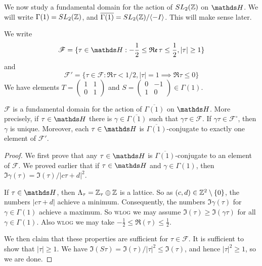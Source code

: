 \documentclass[10pt,a4paper]{article}
\begin{document}
We now study a fundamental domain for the action of $SL_2(\mathbb{Z})$ on $\H$. We will write $\Gamma(1) = SL_2(\mathbb{Z})$, and $\overline{\Gamma(1)} = SL_2(\mathbb{Z})/\langle -I \rangle$. This will make sense later.

We write \[\mathscr{F} = \{\tau \in \H : -\frac12 \leq \Re\tau \leq \frac12, |\tau|\geq 1\}\] and \[\mathscr{F}' = \{\tau \in \mathscr{F} : \Re \tau < 1/2, |\tau| = 1 \implies \Re\tau \leq 0\}\]
We have elements $T = \begin{pmatrix} 1&1\\0&1\end{pmatrix}$ and $S =\begin{pmatrix}0&-1\\1&0\end{pmatrix}\in \Gamma(1)$.
\begin{proposition}
  $\mathscr{F}$ is a fundamental domain for the action of $\overline{\Gamma(1)}$ on $\H$. More precisely, if $\tau\in\H$ there is $\gamma \in \overline{\Gamma(1)}$ such that $\gamma\tau \in \mathscr{F}$. If $\gamma \tau \in \mathscr{F}^\circ$, then $\gamma$ is unique. Moreover, each $\tau \in \H$ is $\overline{\Gamma(1)}$-conjugate to exactly one element of $\mathscr{F}'$.
\end{proposition}
\begin{proof}
  We first prove that any $\tau \in \H$ is $\overline{\Gamma(1)}$-conjugate to an element of $\mathscr{F}$. We proved earlier that if $\tau \in \H$ and $\gamma \in \Gamma(1)$, then $\Im \gamma(\tau) = \Im(\tau)/|c\tau+d|^2$.

  If $\tau \in \H$, then $\Lambda_\tau = \mathbb{Z}_\tau \oplus \mathbb{Z}$ is a lattice. So as $(c,d) \in \mathbb{Z}^2\setminus\{0\}$, the numbers $|c\tau+d|$ achieve a minimum. Consequently, the numbers $\Im \gamma(\tau)$ for $\gamma \in \Gamma(1)$ achieve a maximum. So \textsc{wlog} we may assume $\Im(\tau) \geq \Im(\gamma \tau)$ for all $\gamma \in \Gamma(1)$. Also \textsc{wlog} we may take $-\frac12 \leq \Re(\tau) \leq \frac12$.

  We then claim that these properties are sufficient for $\tau \in \mathscr{F}$. It is sufficient to show that $|\tau| \geq 1$. We have $\Im(S\tau) = \Im(\tau)/|\tau|^2 \leq \Im(\tau)$, and hence $|\tau|^2 \geq 1$, so we are done.
\end{proof}
\end{document}
